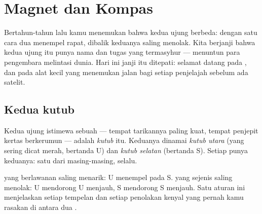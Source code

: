 \chapter{Magnet dan Kompas}\label{ch:g4:magnets-and-compass}

Bertahun-tahun lalu kamu menemukan bahwa kedua ujung  berbeda:
dengan satu cara dua  menempel rapat, dibalik keduanya saling
menolak. Kita berjanji bahwa kedua ujung itu punya nama dan tugas yang
termasyhur --- menuntun para pengembara melintasi dunia. Hari ini
janji itu ditepati: selamat datang pada , dan pada alat kecil
yang menemukan jalan bagi setiap penjelajah sebelum ada satelit.

\section{Kedua kutub}

\begin{definition}[Kutub]\label{def:g4:magnets-and-compass:poles}
Kedua ujung istimewa sebuah  --- tempat tarikannya paling kuat,
tempat penjepit kertas berkerumun --- adalah \emph{kutub}
 itu. Keduanya dinamai
\emph{kutub utara} (yang sering dicat merah, bertanda U)
dan \emph{kutub selatan} (bertanda S). Setiap
 punya keduanya: satu dari masing-masing, selalu.
\end{definition}

\begin{proposition}\label{prop:g4:magnets-and-compass:rule}
 yang berlawanan saling menarik: U menempel pada S.  yang
sejenis saling menolak: U mendorong U menjauh, S mendorong S menjauh.
Satu aturan ini menjelaskan setiap tempelan dan setiap penolakan
kenyal yang pernah kamu rasakan di antara dua .
\end{proposition}

